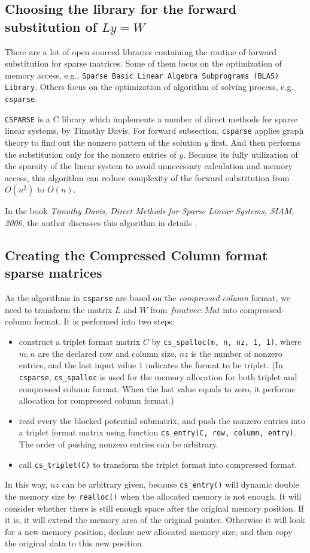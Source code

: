 \documentclass[a4paper,fleqn,13pt]{article}
\begin{document}
\subsection{Choosing the library for the forward substitution of $L y = W $}
There are a lot of open sourced libraries containing the routine of forward substitution for sparse matrices. Some of them focus on the optimization of memory access, e.g., \lstinline!Sparse Basic Linear Algebra Subprograms (BLAS) Library!. Others focus on the optimization of algorithm of solving process, e.g. \lstinline!csparse!.

\lstinline!CSPARSE! is a C library which implements a number of direct methods for sparse linear systems, by Timothy Davis.
For forward subsection, \lstinline!csparse! applies graph theory to find out the nonzero pattern of the solution $y$ first. And then performs the substitution only for the nonzero entries of $y$.
Because its fully utilization of the sparsity of the linear system to avoid unnecessary calculation and memory access, this algorithm can reduce complexity of the forward substitution from $O(n^2)$ to $O(n)$. 

In the book \emph{Timothy Davis, Direct Methods for Sparse Linear Systems, SIAM, 2006}, the author discusses this algorithm in details .

\subsection{Creating the Compressed Column format sparse matrices}
As the algorithms in \lstinline!csparse! are based on the \emph{compressed-column} format, we need to transform the matrix $L$ and $W$ from $fmatvec: Mat$ into compressed-column format.
It is performed into two steps: 
\begin{itemize}
 \item construct a triplet format matrix $C$ by \lstinline!cs_spalloc(m, n, nz, 1, 1)!, 
  where $m, n$ are the declared row and column size, $nz$ is the number of nonzero entries, and the last input value $1$ indicates the format to be triplet. (In \lstinline!csparse!, \lstinline!cs_spalloc! is used for the memory allocation for both triplet and compressed column format. When the last value equals to zero, it performs allocation for compressed column format.) 
 \item read every the blocked potential submatrix, and push the nonzero entries into a triplet format matrix using function \lstinline!cs_entry(C, row, column, entry)!. The order of pushing nonzero entries can be arbitrary.
 \item call \lstinline!cs_triplet(C)! to transform the triplet format into compressed format.
\end{itemize}
In this way, $nz$ can be arbitrary given, because 
\lstinline!cs_entry()! will dynamic double the memory size by \lstinline!realloc()! when the allocated memory is not enough. It will consider whether there is still enough space after the original memory position. If it is, it will extend the memory area of the original pointer. Otherwise it will look for a new memory position, declare new allocated memory size, and then copy the original data to this new position.
\end{document}
